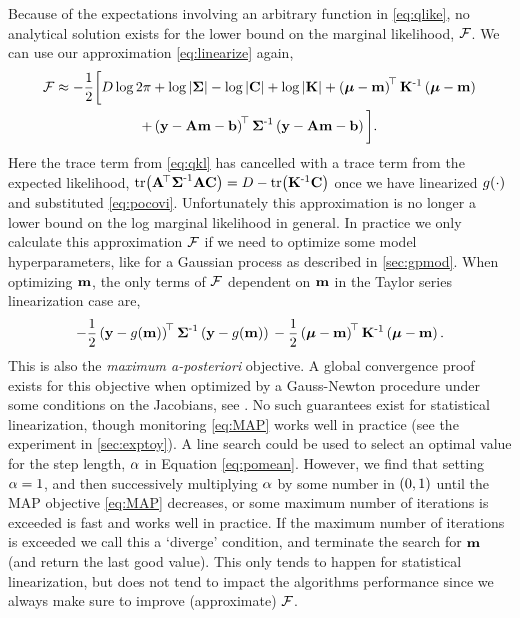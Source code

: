 \documentclass{article} %
\begin{document}
Because of the expectations involving an arbitrary function in
\eqref{eq:qlike}, no analytical solution exists for the lower bound on the
marginal likelihood, $\mathcal{F}$. We can use our approximation
\eqref{eq:linearize} again,
\begin{multline}
    \mathcal{F} \approx - \frac{1}{2} \bigg[
    D\log{2\pi} + \log\left|{\boldsymbol{\Sigma}}\right| - \log\left|{\mathbf{C}}\right| + \log{\ensuremath{\left|{\mathbf{K}}\right|}}
    + \left({\boldsymbol{\mu} - \mathbf{m}}\right)^{\!\top}\mathbf{K}^{\text{-}1}
    \left({\boldsymbol{\mu} - \mathbf{m}}\right) \\
    + \left({\mathbf{y} - \mathbf{A}\mathbf{m} - \mathbf{b}}\right)^{\!\top}\boldsymbol{\Sigma}^{\text{-}1}
        \left({\mathbf{y} - \mathbf{A}\mathbf{m} - \mathbf{b}}\right)
        \bigg].
    \label{eq:approxfengy}
\end{multline}
Here the trace term from \eqref{eq:qkl} has cancelled with a trace term from
the expected likelihood, $\text{tr}\!\left({\mathbf{A}^{\!\top}\boldsymbol{\Sigma}^{\text{-}1}\mathbf{A}\mathbf{C}}\right) = D -
\text{tr}\!\left({\mathbf{K}^{\text{-}1}\mathbf{C}}\right)$ once we have linearized $g\!\left({{\cdot}}\right)$ and
substituted \eqref{eq:pocovi}. Unfortunately this approximation is no longer a
lower bound on the log marginal likelihood in general. In practice we only
calculate this approximation $\mathcal{F}$ if we need to optimize some model
hyperparameters, like for a Gaussian process as described in
\autoref{sec:gpmod}. When optimizing $\mathbf{m}$, the only terms of $\mathcal{F}$
dependent on $\mathbf{m}$ in the Taylor series linearization case are,
\begin{equation}
    -\frac{1}{2} \left({\mathbf{y} - g\!\left({{\mathbf{m}}}\right)}\right)^{\!\top}
            \boldsymbol{\Sigma}^{\text{-}1}
            \left({\mathbf{y} - g\!\left({{\mathbf{m}}}\right)}\right) \\
    -\frac{1}{2}
    \left({\boldsymbol{\mu} - \mathbf{m}}\right)^{\!\top}\mathbf{K}^{\text{-}1}\left({\boldsymbol{\mu} - \mathbf{m}}\right).
    \label{eq:MAP}
\end{equation}
This is also the \emph{maximum a-posteriori} objective. A global convergence
proof exists for this objective when optimized by a Gauss-Newton procedure
under some conditions on the Jacobians, see \cite[p255]{Nocedal2006}.  No such
guarantees exist for statistical linearization, though monitoring
\eqref{eq:MAP} works well in practice (see the experiment in
\autoref{sec:exptoy}). 
A line search could be used to select an optimal value for the step length,
$\alpha$ in Equation \eqref{eq:pomean}. However, we find that setting $\alpha=1$,
and then successively multiplying $\alpha$ by some number in $\left({0, 1}\right)$ until
the MAP objective \eqref{eq:MAP} decreases, or some maximum number of
iterations is exceeded is fast and works well in practice. If the maximum
number of iterations is exceeded we call this a `diverge' condition, and
terminate the search for $\mathbf{m}$ (and return the last good value). This only
tends to happen for statistical linearization, but does not tend to impact the
algorithms performance since we always make sure to improve (approximate)
$\mathcal{F}$.
\end{document}
